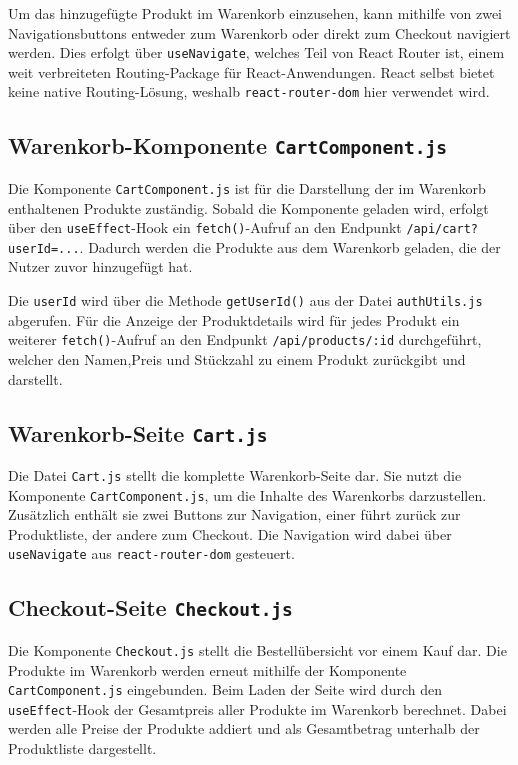 \documentclass[oneside]{ausarbeitung}
\begin{document}
Um das hinzugefügte Produkt im Warenkorb einzusehen, kann mithilfe von zwei Navigationsbuttons entweder zum Warenkorb oder direkt zum Checkout navigiert werden. Dies erfolgt über \texttt{useNavigate}, welches Teil von React Router ist, einem weit verbreiteten Routing-Package für React-Anwendungen. React selbst bietet keine native Routing-Lösung, weshalb \texttt{react-router-dom} hier verwendet wird.

\subsection{Warenkorb-Komponente \texttt{CartComponent.js}} 

Die Komponente \texttt{CartComponent.js} ist für die Darstellung der im Warenkorb enthaltenen Produkte zuständig. Sobald die Komponente geladen wird, erfolgt über den \texttt{useEffect}-Hook ein \texttt{fetch()}-Aufruf an den Endpunkt \texttt{/api/cart?userId=...}. Dadurch werden die Produkte aus dem Warenkorb geladen, die der Nutzer zuvor hinzugefügt hat.

Die \texttt{userId} wird über die Methode \texttt{getUserId()} aus der Datei \texttt{authUtils.js} abgerufen. Für die Anzeige der Produktdetails wird für jedes Produkt ein weiterer \texttt{fetch()}-Aufruf an den Endpunkt \texttt{/api/products/:id} durchgeführt, welcher den Namen,Preis und Stückzahl zu einem Produkt zurückgibt und darstellt.

\subsection{Warenkorb-Seite \texttt{Cart.js}} 

Die Datei \texttt{Cart.js} stellt die komplette Warenkorb-Seite dar.
Sie nutzt die Komponente \texttt{CartComponent.js}, um die Inhalte des Warenkorbs darzustellen. Zusätzlich enthält sie zwei Buttons zur Navigation, einer führt zurück zur Produktliste, der andere zum Checkout. Die Navigation wird dabei über \texttt{useNavigate} aus \texttt{react-router-dom} gesteuert.

\subsection{Checkout-Seite \texttt{Checkout.js}}

Die Komponente \texttt{Checkout.js} stellt die Bestellübersicht vor einem Kauf dar.
Die Produkte im Warenkorb werden erneut mithilfe der Komponente \texttt{CartComponent.js} eingebunden. Beim Laden der Seite wird durch den \texttt{useEffect}-Hook der Gesamtpreis aller Produkte im Warenkorb berechnet. Dabei werden alle Preise der Produkte addiert und als Gesamtbetrag unterhalb der Produktliste dargestellt.
\end{document}
